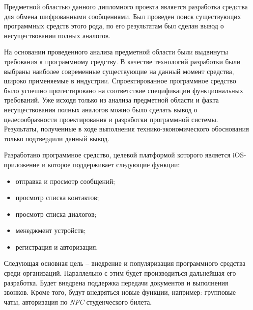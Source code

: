 
Предметной областью данного дипломного проекта является разработка средства для обмена шифрованными сообщениями. Был проведен поиск существующих программных средств этого рода, по его результатам был сделан вывод о несуществовании полных аналогов.

На основании проведенного анализа предметной области были выдвинуты требования к программному средству. В качестве технологий разработки были выбраны наиболее современные существующие на данный момент средства, широко применяемые в индустрии. Спроектированное программное средство было успешно протестировано на соответствие спецификации функциональных требований. Уже исходя только из анализа предметной области и факта несуществования полных аналогов можно было сделать вывод о целесообразности проектирования и разработки программной системы. Результаты, полученные в ходе выполнения технико-экономического обоснования только подтвердили данный вывод.

Разработано программное средство, целевой платформой которого является iOS-приложение и которое поддерживает следующие функции:
\begin{itemize}
	\item отправка и просмотр сообщений;
	\item просмотр списка контактов;
	\item просмотр списка диалогов;
	\item менеджмент устройств;
	\item регистрация и авторизация.
\end{itemize}

Следующая основная цель -- внедрение и популяризация программного средства среди организаций. Параллельно с этим будет производиться дальнейшая его разработка. Будет внедрена поддержка передачи документов и выполнения звонков. Кроме того, будут внедряться новые функции, например: групповые чаты, авторизация по \textit{NFC} студенческого билета.